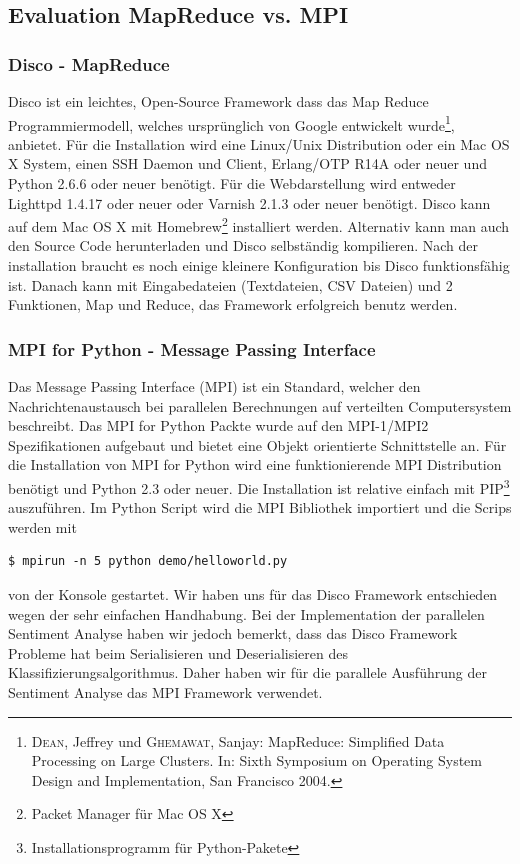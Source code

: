 \documentclass[12pt, oneside]{report}   	%
\begin{document}
\subsection{Evaluation MapReduce vs. MPI}
\subsubsection{Disco - MapReduce}
Disco ist ein leichtes, Open-Source Framework dass das Map Reduce Programmiermodell, welches ursprünglich von Google entwickelt wurde\footnote{\textsc{Dean}, Jeffrey und \textsc{Ghemawat}, Sanjay: MapReduce: Simplified Data Processing on Large Clusters. In: Sixth Symposium on Operating System Design and Implementation, San Francisco 2004.}, anbietet. Für die Installation wird eine Linux/Unix Distribution oder ein Mac OS X System, einen SSH Daemon und Client, Erlang/OTP R14A oder neuer und Python 2.6.6 oder neuer benötigt. Für die Webdarstellung wird entweder Lighttpd 1.4.17 oder neuer oder Varnish 2.1.3 oder neuer benötigt. Disco kann auf dem Mac OS X mit Homebrew\footnote{Packet Manager für Mac OS X} installiert werden. Alternativ kann man auch den Source Code herunterladen und Disco selbständig kompilieren. Nach der installation braucht es noch einige kleinere Konfiguration bis Disco funktionsfähig ist. Danach kann mit Eingabedateien (Textdateien, CSV Dateien) und 2 Funktionen, Map und Reduce, das Framework erfolgreich benutz werden.
\subsubsection{MPI for Python - Message Passing Interface}
Das Message Passing Interface (MPI) ist ein Standard, welcher den Nachrichtenaustausch bei parallelen Berechnungen auf verteilten Computersystem beschreibt. Das MPI for Python Packte wurde auf den MPI-1/MPI2 Spezifikationen aufgebaut und bietet eine Objekt orientierte Schnittstelle an. Für die Installation von MPI for Python wird eine funktionierende MPI Distribution benötigt und Python 2.3 oder neuer. Die Installation ist relative einfach mit PIP\footnote{Installationsprogramm für Python-Pakete} auszuführen. Im Python Script wird die MPI Bibliothek importiert und die Scrips werden mit
\begin{lstlisting}
$ mpirun -n 5 python demo/helloworld.py
\end{lstlisting}
von der Konsole gestartet.\newline{}
Wir haben uns für das Disco Framework entschieden wegen der sehr einfachen Handhabung. Bei der Implementation der parallelen Sentiment Analyse haben wir jedoch bemerkt, dass das Disco Framework Probleme hat beim Serialisieren und Deserialisieren des Klassifizierungsalgorithmus. Daher haben wir für die parallele Ausführung der Sentiment Analyse das MPI Framework verwendet.
\end{document}
